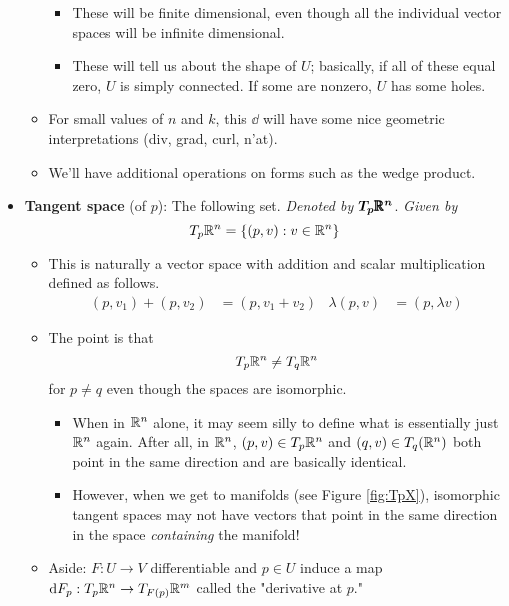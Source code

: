 \documentclass[../notes.tex]{subfiles}
\begin{document}
\begin{itemize}
\begin{itemize}
        \begin{itemize}
            \item These will be finite dimensional, even though all the individual vector spaces will be infinite dimensional.
            \item These will tell us about the shape of $U$; basically, if all of these equal zero, $U$ is simply connected. If some are nonzero, $U$ has some holes.
        \end{itemize}
        \item For small values of $n$ and $k$, this $\dd$ will have some nice geometric interpretations (div, grad, curl, n'at).
        \item We'll have additional operations on forms such as the wedge product.
    \end{itemize}
    \item \textbf{Tangent space} (of $p$): The following set. \emph{Denoted by} $\bm{T_p\pmb{\mathbb{R}}^n}$. \emph{Given by}
    \begin{equation*}
        T_p\mathbb{R}^n = \{(p,v):v\in\mathbb{R}^n\}
    \end{equation*}
    \begin{itemize}
        \item This is naturally a vector space with addition and scalar multiplication defined as follows.
        \begin{align*}
            (p,v_1)+(p,v_2) &= (p,v_1+v_2)&
            \lambda(p,v) &= (p,\lambda v)
        \end{align*}
        \item The point is that
        \begin{equation*}
            T_p\mathbb{R}^n \neq T_q\mathbb{R}^n
        \end{equation*}
        for $p\neq q$ even though the spaces are isomorphic.
        \begin{itemize}
            \item When in $\mathbb{R}^n$ alone, it may seem silly to define what is essentially just $\mathbb{R}^n$ again. After all, in $\mathbb{R}^n$, $(p,v)\in T_p\mathbb{R}^n$ and $(q,v)\in T_q(\mathbb{R}^n)$ both point in the same direction and are basically identical.
            \item However, when we get to manifolds (see Figure \ref{fig:TpX}), isomorphic tangent spaces may not have vectors that point in the same direction in the space \emph{containing} the manifold!
        \end{itemize}
        \item Aside: $F:U\to V$ differentiable and $p\in U$ induce a map $\dd{F_p}:T_p\mathbb{R}^n\to T_{F(p)}\mathbb{R}^m$ called the "derivative at $p$."

\end{itemize}
\end{itemize}
\end{document}
